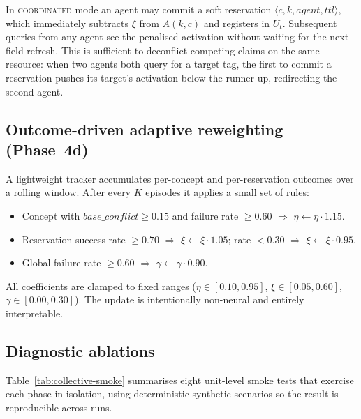 In \textsc{coordinated} mode an agent may commit a soft reservation
$\langle c, k, agent, ttl \rangle$, which immediately subtracts $\xi$
from $A(k,c)$ and registers in $U_t$.  Subsequent queries from any
agent see the penalised activation without waiting for the next field
refresh.  This is sufficient to deconflict competing claims on the
same resource: when two agents both query for a target tag, the first
to commit a reservation pushes its target's activation below the
runner-up, redirecting the second agent.

\subsection{Outcome-driven adaptive reweighting (Phase~4d)}
\label{sec:phase4d}

A lightweight tracker accumulates per-concept and per-reservation
outcomes over a rolling window.  After every $K$ episodes it applies a
small set of rules:
\begin{itemize}
\item Concept with $base\_conflict \ge 0.15$ and failure rate
      $\ge 0.60$ $\Rightarrow$ $\eta \leftarrow \eta \cdot 1.15$.
\item Reservation success rate $\ge 0.70$ $\Rightarrow$ $\xi \leftarrow \xi \cdot 1.05$;
      rate $< 0.30$ $\Rightarrow$ $\xi \leftarrow \xi \cdot 0.95$.
\item Global failure rate $\ge 0.60$ $\Rightarrow$ $\gamma \leftarrow \gamma \cdot 0.90$.
\end{itemize}
All coefficients are clamped to fixed ranges
($\eta\in[0.10,0.95]$, $\xi\in[0.05,0.60]$, $\gamma\in[0.00,0.30]$).
The update is intentionally non-neural and entirely interpretable.

\subsection{Diagnostic ablations}
\label{sec:collective-ablation}

Table~\ref{tab:collective-smoke} summarises eight unit-level smoke
tests that exercise each phase in isolation, using deterministic
synthetic scenarios so the result is reproducible across runs.

